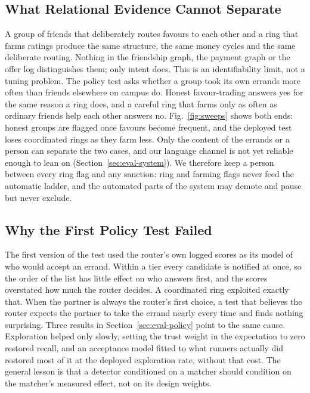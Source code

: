 \subsection{What Relational Evidence Cannot Separate}
A group of friends that deliberately routes favours to each other and a ring that
farms ratings produce the same structure, the same money cycles and the same
deliberate routing. Nothing in the friendship graph, the payment graph or the offer
log distinguishes them; only intent does. This is an identifiability limit, not a
tuning problem. The policy test asks whether a group took its own errands more often
than friends elsewhere on campus do. Honest favour-trading answers yes for the same
reason a ring does, and a careful ring that farms only as often as ordinary friends
help each other answers no. Fig.~\ref{fig:sweeps} shows both ends: honest groups are
flagged once favours become frequent, and the deployed test loses coordinated rings
as they farm less. Only the content of the errands or a person can separate the two
cases, and our language channel is not yet reliable enough to lean on
(Section~\ref{sec:eval-system}). We therefore keep a person between every ring flag
and any sanction: ring and farming flags never feed the automatic ladder, and the
automated parts of the system may demote and pause but never exclude.

\subsection{Why the First Policy Test Failed}
The first version of the test used the router's own logged scores as its model of
who would accept an errand. Within a tier every candidate is notified at once, so the
order of the list has little effect on who answers first, and the scores overstated
how much the router decides. A coordinated ring exploited exactly that. When the
partner is always the router's first choice, a test that believes the router expects
the partner to take the errand nearly every time and finds nothing surprising. Three
results in Section~\ref{sec:eval-policy} point to the same cause. Exploration helped
only slowly, setting the trust weight in the expectation to zero restored recall, and
an acceptance model fitted to what runners actually did restored most of it at the
deployed exploration rate, without that cost. The general lesson is that a detector
conditioned on a matcher should condition on the matcher's measured effect, not on
its design weights.

